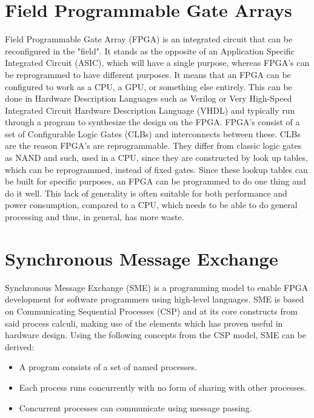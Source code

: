 \documentclass[a4paper, openany]{book}
\begin{document}
\begin{abstact}
\section{Field Programmable Gate Arrays}
\label{sec:orga882c4f}
Field Programmable Gate Array (FPGA) is an integrated circuit that can be reconfigured in the "field". It stands as the opposite of an Application Specific Integrated Circuit (ASIC), which will have a single purpose, whereas FPGA's can be reprogrammed to have different purposes. It means that an FPGA can be configured to work as a CPU, a GPU, or something else entirely. This can be done in Hardware Description Languages such as Verilog or Very High-Speed Integrated Circuit Hardware Description Language (VHDL) and typically run through a program to synthesize the design on the FPGA.
FPGA's consist of a set of Configurable Logic Gates (CLBs) and interconnects between these. CLBs are the reason FPGA's are reprogrammable. They differ from classic logic gates as NAND and such, used in a CPU, since they are constructed by look up tables, which can be reprogrammed, instead of fixed gates. Since these lookup tables can be built for specific purposes, an FPGA can be programmed to do one thing and do it well. This lack of generality is often suitable for both performance and power consumption, compared to a CPU, which needs to be able to do general processing and thus, in general, has more waste.

\section{Synchronous Message Exchange}
\label{sec:org6f90f23}
Synchronous Message Exchange (SME) is a programming model to enable FPGA development for software programmers using high-level languages. SME is based on Communicating Sequential Processes (CSP) and at its core constructs from said process calculi, making use of the elements which has proven useful in hardware design\cite{sme}. Using the following concepts from the CSP model\cite{CSP}, SME can be derived:

\begin{itemize}
\item A program consists of a set of named processes.
\item Each process runs concurrently with no form of sharing with other processes.
\item Concurrent processes can communicate using message passing.
\end{itemize}


\end{abstact}
\end{document}
